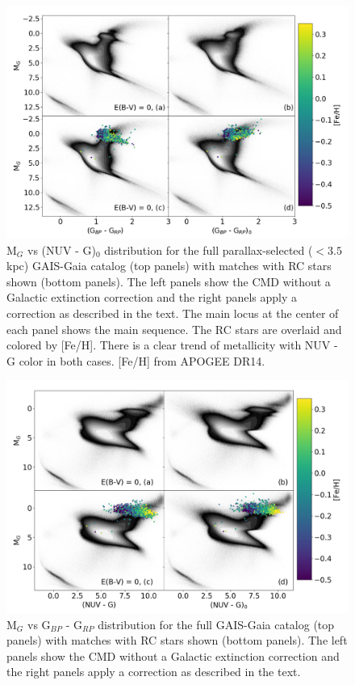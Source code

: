\documentclass[twocolumn]{emulateapj}
\begin{document}
\begin{figure}[]
\centering
\includegraphics[width=1\textwidth]{f1.pdf}
\caption{M$_G$ vs (NUV - G)$_0$ distribution for the full parallax-selected ($<3.5$ kpc) GAIS-Gaia catalog  (top panels) with matches with RC stars shown (bottom panels). The left panels show the CMD without a Galactic extinction correction and the right panels apply a correction as described in the text. The main locus at the center of each panel shows the main sequence.  The RC stars are overlaid and colored by [Fe/H]. There is a clear trend of metallicity with NUV - G color in both cases. [Fe/H] from APOGEE DR14.}
\end{figure}

\begin{figure}[]
\centering
\includegraphics[width=1\textwidth]{f2.pdf}
\caption{M$_G$ vs G$_{BP}$ - G$_{RP}$ distribution for the full GAIS-Gaia catalog (top panels) with matches with RC stars shown (bottom panels). The left panels show the CMD without a Galactic extinction correction and the right panels apply a correction as described in the text. }
\end{figure}
\end{document}
